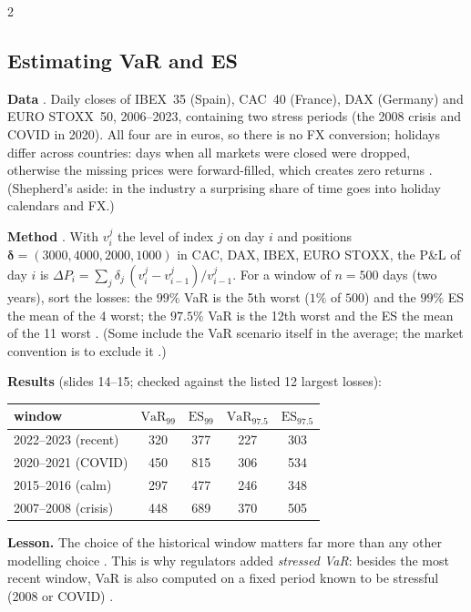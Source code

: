 \begin{paracol}{2}
\subsection{Estimating VaR and ES}\label{ch08:sec-estimation}

\begin{casestudy}
\textbf{Data} . Daily closes of IBEX~35 (Spain), CAC~40 (France), DAX (Germany) and EURO STOXX~50,
2006--2023, containing two stress periods (the 2008 crisis and COVID in 2020). All four are in euros, so there is no FX
conversion; holidays differ across countries: days when all markets were closed were dropped, otherwise the
missing prices were forward-filled, which creates zero returns . (Shepherd's aside: in the
industry a surprising share of time goes into holiday calendars and FX.)

\textbf{Method} . With $v_i^j$ the level of index $j$ on day $i$ and positions
$\bm\delta=(3000,4000,2000,1000)$ in CAC, DAX, IBEX, EURO STOXX, the P\&L of day $i$ is
$\Delta P_i=\sum_j\delta_j\,(v_i^j-v_{i-1}^j)/v_{i-1}^j$. For a window of $n=500$ days (two years), sort the
losses: the $99\%$ VaR is the 5th worst ($1\%$ of $500$) and the $99\%$ ES the mean of the 4 worst; the $97.5\%$ VaR
is the 12th worst and the ES the mean of the 11 worst . (Some include the VaR scenario itself in
the average; the market convention is to exclude it .)

\textbf{Results} (slides 14--15; checked against the listed 12 largest losses):
\begin{center}\small
\begin{tabular}{@{}lcccc@{}}
\toprule
window & $\mathrm{VaR}_{99}$ & $\mathrm{ES}_{99}$ & $\mathrm{VaR}_{97.5}$ & $\mathrm{ES}_{97.5}$\\
\midrule
2022--2023 (recent)   & 320 & 377 & 227 & 303\\
2020--2021 (COVID)    & 450 & 815 & 306 & 534\\
2015--2016 (calm)     & 297 & 477 & 246 & 348\\
2007--2008 (crisis)   & 448 & 689 & 370 & 505\\
\bottomrule
\end{tabular}
\end{center}
\textbf{Lesson.} The choice of the historical window matters far more than any other modelling choice
. This is why regulators added \emph{stressed VaR}: besides the most recent window, VaR is also
computed on a fixed period known to be stressful (2008 or COVID) .
\end{casestudy}


\end{paracol}
